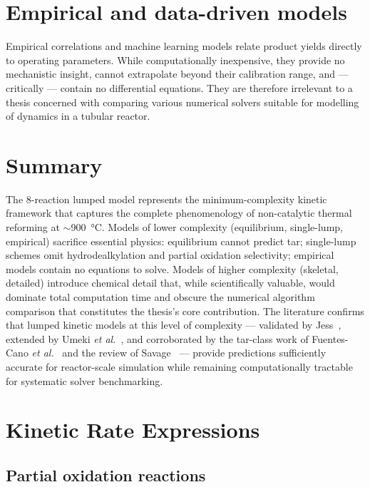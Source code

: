 \section{Empirical and data-driven models}\label{sec:empirical}

Empirical correlations and machine learning models relate product yields directly to operating parameters. While computationally inexpensive, they provide no mechanistic insight, cannot extrapolate beyond their calibration range, and --- critically --- contain no differential equations. They are therefore irrelevant to a thesis concerned with comparing various numerical solvers suitable for modelling of dynamics in a tubular reactor.

\section{Summary}\label{sec:kinetic_conclusion}

The 8-reaction lumped model represents the minimum-complexity kinetic framework that captures the complete phenomenology of non-catalytic thermal reforming at \(\sim\)\SI{900}{\degreeCelsius}. Models of lower complexity (equilibrium, single-lump, empirical) sacrifice essential physics: equilibrium cannot predict tar; single-lump schemes omit hydrodealkylation and partial oxidation selectivity; empirical models contain no equations to solve. Models of higher complexity (skeletal, detailed) introduce chemical detail that, while scientifically valuable, would dominate total computation time and obscure the numerical algorithm comparison that constitutes the thesis's core contribution. The literature confirms that lumped kinetic models at this level of complexity --- validated by Jess~\cite{Jess1996}, extended by Umeki \textit{et al.}~\cite{Umeki2012}, and corroborated by the tar-class work of Fuentes-Cano \textit{et al.}~\cite{FuentesCano2016} and the review of Savage~\cite{Savage2000} --- provide predictions sufficiently accurate for reactor-scale simulation while remaining computationally tractable for systematic solver benchmarking.

\section{Kinetic Rate Expressions}\label{sec:kinetic_rates}

\subsection{Partial oxidation reactions}\label{ssec:partial_oxidation}

